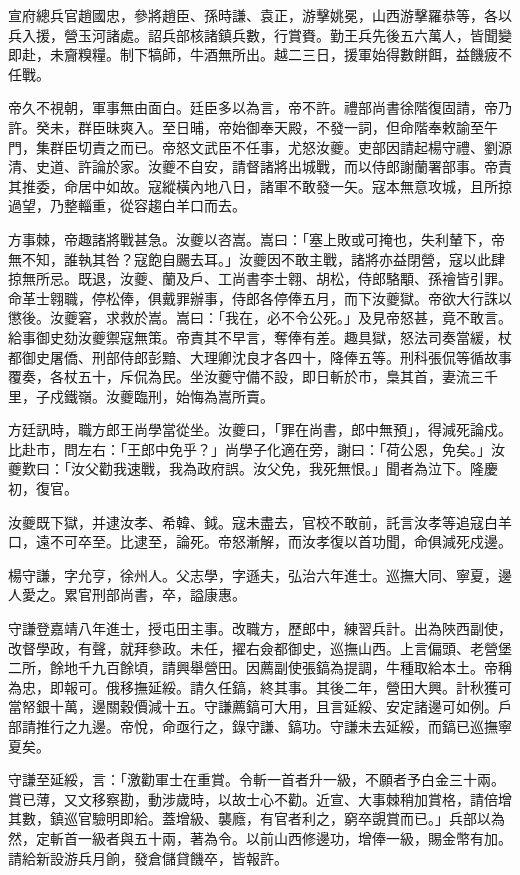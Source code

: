 \begin{pinyinscope}
宣府總兵官趙國忠，參將趙臣、孫時謙、袁正，游擊姚冕，山西游擊羅恭等，各以兵入援，營玉河諸處。詔兵部核諸鎮兵數，行賞賚。勤王兵先後五六萬人，皆聞變即赴，未齎糗糧。制下犒師，牛酒無所出。越二三日，援軍始得數餅餌，益饑疲不任戰。

帝久不視朝，軍事無由面白。廷臣多以為言，帝不許。禮部尚書徐階復固請，帝乃許。癸未，群臣昧爽入。至日晡，帝始御奉天殿，不發一詞，但命階奉敕諭至午門，集群臣切責之而已。帝怒文武臣不任事，尤怒汝夔。吏部因請起楊守禮、劉源清、史道、許論於家。汝夔不自安，請督諸將出城戰，而以侍郎謝蘭署部事。帝責其推委，命居中如故。寇縱橫內地八日，諸軍不敢發一矢。寇本無意攻城，且所掠過望，乃整輜重，從容趨白羊口而去。

方事棘，帝趣諸將戰甚急。汝夔以咨嵩。嵩曰：「塞上敗或可掩也，失利輦下，帝無不知，誰執其咎？寇飽自颺去耳。」汝夔因不敢主戰，諸將亦益閉營，寇以此肆掠無所忌。既退，汝夔、蘭及戶、工尚書李士翱、胡松，侍郎駱顒、孫禬皆引罪。命革士翱職，停松俸，俱戴罪辦事，侍郎各停俸五月，而下汝夔獄。帝欲大行誅以懲後。汝夔窘，求救於嵩。嵩曰：「我在，必不令公死。」及見帝怒甚，竟不敢言。給事御史劾汝夔禦寇無策。帝責其不早言，奪俸有差。趣具獄，怒法司奏當緩，杖都御史屠僑、刑部侍郎彭黯、大理卿沈良才各四十，降俸五等。刑科張侃等循故事覆奏，各杖五十，斥侃為民。坐汝夔守備不設，即日斬於市，梟其首，妻流三千里，子戍鐵嶺。汝夔臨刑，始悔為嵩所賣。

方廷訊時，職方郎王尚學當從坐。汝夔曰，「罪在尚書，郎中無預」，得減死論戍。比赴市，問左右：「王郎中免乎？」尚學子化適在旁，謝曰：「荷公恩，免矣。」汝夔歎曰：「汝父勸我速戰，我為政府誤。汝父免，我死無恨。」聞者為泣下。隆慶初，復官。

汝夔既下獄，并逮汝孝、希韓、鉞。寇未盡去，官校不敢前，託言汝孝等追寇白羊口，遠不可卒至。比逮至，論死。帝怒漸解，而汝孝復以首功聞，命俱減死戍邊。

楊守謙，字允亨，徐州人。父志學，字遜夫，弘治六年進士。巡撫大同、寧夏，邊人愛之。累官刑部尚書，卒，謚康惠。

守謙登嘉靖八年進士，授屯田主事。改職方，歷郎中，練習兵計。出為陜西副使，改督學政，有聲，就拜參政。未任，擢右僉都御史，巡撫山西。上言偏頭、老營堡二所，餘地千九百餘頃，請興舉營田。因薦副使張鎬為提調，牛種取給本土。帝稱為忠，即報可。俄移撫延綏。請久任鎬，終其事。其後二年，營田大興。計秋獲可當帑銀十萬，邊關穀價減十五。守謙薦鎬可大用，且言延綏、安定諸邊可如例。戶部請推行之九邊。帝悅，命亟行之，錄守謙、鎬功。守謙未去延綏，而鎬已巡撫寧夏矣。

守謙至延綏，言：「激勸軍士在重賞。令斬一首者升一級，不願者予白金三十兩。賞已薄，又文移察勘，動涉歲時，以故士心不勸。近宣、大事棘稍加賞格，請倍增其數，鎮巡官驗明即給。蓋增級、襲廕，有官者利之，窮卒覬賞而已。」兵部以為然，定斬首一級者與五十兩，著為令。以前山西修邊功，增俸一級，賜金幣有加。請給新設游兵月餉，發倉儲貸饑卒，皆報許。


\end{pinyinscope}
